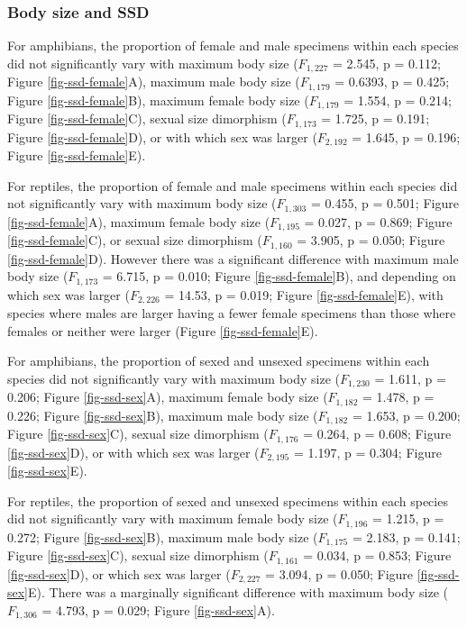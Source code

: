 \documentclass[a4paper, 12pt]{article}
\begin{document}
\subsubsection{Body size and SSD}
For amphibians, the proportion of female and male specimens within each species did not significantly vary with maximum body size ($F_{1,227}$ =  2.545, p = 0.112; Figure \ref{fig-ssd-female}A), maximum male body size ($F_{1,179}$ =  0.6393, p = 0.425; Figure \ref{fig-ssd-female}B), maximum female body size ($F_{1,179}$ =  1.554, p = 0.214; Figure \ref{fig-ssd-female}C), sexual size dimorphism ($F_{1,173}$ =  1.725, p = 0.191; Figure \ref{fig-ssd-female}D), or with which sex was larger ($F_{2,192}$ =  1.645, p = 0.196; Figure \ref{fig-ssd-female}E).   

For reptiles, the proportion of female and male specimens within each species did not significantly vary with maximum body size ($F_{1,303}$ =  0.455, p = 0.501; Figure \ref{fig-ssd-female}A), maximum female body size  ($F_{1,195}$ =  0.027, p = 0.869; Figure \ref{fig-ssd-female}C), or sexual size dimorphism ($F_{1,160}$ =  3.905, p = 0.050; Figure \ref{fig-ssd-female}D). However there was a significant difference with maximum male body size  ($F_{1,173}$ =  6.715, p = 0.010; Figure \ref{fig-ssd-female}B), and depending on which sex was larger ($F_{2,226}$ =  14.53, p = 0.019; Figure \ref{fig-ssd-female}E), with species where males are larger having a fewer female specimens than those where females or neither were larger (Figure \ref{fig-ssd-female}E).

For amphibians, the proportion of sexed and unsexed specimens within each species did not significantly vary with maximum body size ($F_{1,230}$ =  1.611, p = 0.206; Figure \ref{fig-ssd-sex}A), maximum female body size ($F_{1,182}$ =  1.478, p = 0.226; Figure \ref{fig-ssd-sex}B), maximum male body size ($F_{1,182}$ =  1.653, p = 0.200; Figure \ref{fig-ssd-sex}C), sexual size dimorphism ($F_{1,176}$ =  0.264, p = 0.608; Figure \ref{fig-ssd-sex}D), or with which sex was larger ($F_{2,195}$ =  1.197, p = 0.304; Figure \ref{fig-ssd-sex}E).   

For reptiles, the proportion of sexed and unsexed specimens within each species did not significantly vary with maximum female body size  ($F_{1,196}$ =  1.215, p = 0.272; Figure \ref{fig-ssd-sex}B), maximum male body size ($F_{1,175}$ =  2.183, p = 0.141; Figure \ref{fig-ssd-sex}C), sexual size dimorphism ($F_{1,161}$ =  0.034, p = 0.853; Figure \ref{fig-ssd-sex}D), or which sex was larger ($F_{2,227}$ =  3.094, p = 0.050; Figure \ref{fig-ssd-sex}E). There was a marginally significant difference with maximum body size ($F_{1,306}$ =  4.793, p = 0.029; Figure \ref{fig-ssd-sex}A).
\end{document}
